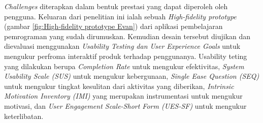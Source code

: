 \textit{Challenges} diterapkan dalam bentuk prestasi yang dapat diperoleh oleh pengguna.
Keluaran dari penelitian ini ialah sebuah \textit{High-fidelity prototype} (gambar \ref*{fig:High-fidelity prototype Evan}) dari aplikasi pembelajaran pemrograman yang sudah dirumuskan.
Kemudian desain tersebut diujikan dan dievaluasi menggunakan \textit{Usability Testing dan User Experience Goals} untuk mengukur perfroma interaktif produk terhadap penggunanya.
Usability teting yang dilakukan berupa \textit{Completion Rate} untuk mengukur efektivitas, \textit{System Usability Scale (SUS)} untuk mengukur kebergunaan,
\textit{Single Ease Question (SEQ)} untuk mengukur tingkat kesulitan dari aktivitas yang diberikan, \textit{Intrinsic Motivation Inventory (IMI)} yang merupakan instrumentasi untuk mengukur motivasi,
dan \textit{User Engagement Scale-Short Form (UES-SF)} untuk mengukur keterlibatan.
